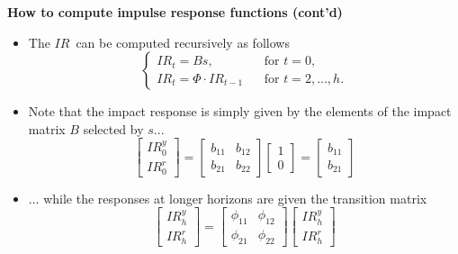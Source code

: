 \documentclass[10pt,english,t,aspectratio=169,ignorenonframetext]{beamer}
\begin{document}
\begin{frame}
{\textbf{How to compute {impulse response functions (cont'd)}}}

\begin{itemize}
\item The $IR$\ can be computed recursively as follows%
\begin{equation*}
\left\{ 
\begin{array}{ll}
IR_{t}=Bs, & \ \ \ \ \text{for }t=0, \\ 
IR_{t}=\Phi \cdot IR_{t-1} & \ \ \ \ \text{for }t=2,...,h.%
\end{array}%
\right.
\end{equation*}

\item Note that the impact response is simply given by the elements of the
impact matrix $B$ selected by $s$...%
\begin{equation*}
\left[ 
\begin{array}{c}
IR_{0}^{y} \\ 
IR_{0}^{r}%
\end{array}%
\right] =\left[ 
\begin{array}{cc}
b_{11} & b_{12} \\ 
b_{21} & b_{22}%
\end{array}%
\right] \left[ 
\begin{array}{c}
1 \\ 
0%
\end{array}%
\right] =\left[ 
\begin{array}{c}
b_{11} \\ 
b_{21}%
\end{array}%
\right]
\end{equation*}

\item ... while the responses at longer horizons are given the transition
matrix 
\begin{equation*}
\left[ 
\begin{array}{c}
IR_{h}^{y} \\ 
IR_{h}^{r}%
\end{array}%
\right] =%
\begin{bmatrix}
\phi _{11} & \phi _{12} \\ 
\phi _{21} & \phi _{22}%
\end{bmatrix}%
\left[ 
\begin{array}{c}
IR_{h}^{y} \\ 
IR_{h}^{r}%
\end{array}%
\right]
\end{equation*}
\end{itemize}
\end{frame}
\end{document}
